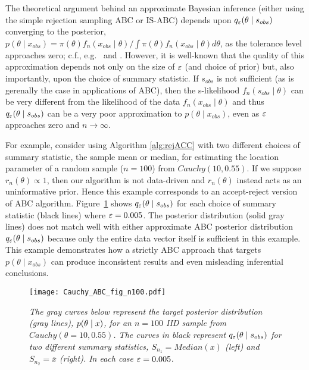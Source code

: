 \noindent
\hrulefill


The theoretical argument behind an approximate Bayesian inference (either using the simple rejection sampling ABC or IS-ABC) depends upon $q_{\varepsilon}(\theta\mid s_{\relax obs})$ converging to the posterior, $p(\theta \mid x_{obs}) = {\pi(\theta) f_n ( x_{obs} \mid\theta)}\big/{\int \pi(\theta) f_n ( x_{obs} \mid\theta)
d \theta }$, as the tolerance level approaches zero; c.f., e.g.~\cite{Marin2011} and \cite{Beaumont2019}. However, it is well-known that the quality of this approximation depends not only on the size of $\varepsilon$ (and choice of prior) but, also importantly, upon the choice of summary statistic. If $s_{obs}$ is not sufficient (as is gerenally the case in applications of ABC), then the s-likelihood $f_n (s_{obs} \mid\theta)$ can be very different from the likelihood of the data $f_n ( x_{obs} \mid\theta)$ and thus $q_{\varepsilon}(\theta\mid s_{\relax obs})$ can be a very poor approximation to $p(\theta\mid x_{obs})$, even as $\varepsilon$ approaches zero and $n \rightarrow \infty$.

For example, consider using Algorithm \ref{alg:rejACC} with two different choices of summary statistic, the sample mean or median, for estimating the location parameter of a random sample ($n=100$) from $Cauchy(10, 0.55)$. If we suppose $r_n(\theta) \propto 1$, then our algorithm is not data-driven and $r_n(\theta)$ instead acts as an uninformative prior. Hence this example corresponds to an accept-reject version of ABC algorithm. 
Figure~\ref{fig:ACC} shows $q_{\varepsilon}(\theta\mid s_{\relax obs})$ for each choice of summary statistic (black lines) where $\varepsilon = 0.005$. 
The posterior distribution (solid gray lines) does not match well with either approximate ABC posterior distribution $q_{\varepsilon}(\theta\mid s_{\relax obs})$ because only the entire data vector itself is sufficient in this example. This example demonstrates how a strictly ABC approach that targets $p(\theta \mid x_{obs})$ can produce inconsistent results and even misleading inferential conclusions.

\begin{figure}
\centering
\caption{{\it The gray curves below represent the target posterior distribution (gray lines), $p(\theta \mid {}{x})$, for an $n=100$ IID sample from $Cauchy(\theta=10,0.55)$. The curves in black represent  $q_{\varepsilon}(\theta \mid s_{obs})$ for two different summary statistics, $S_{n_1} = Median(x)$ (left) and $S_{n_2} = \bar{x}$ (right). In each case $\varepsilon = 0.005$.} }\label{fig:ACC}
\texttt{[image: Cauchy\_ABC\_fig\_n100.pdf]}
\end{figure}	


